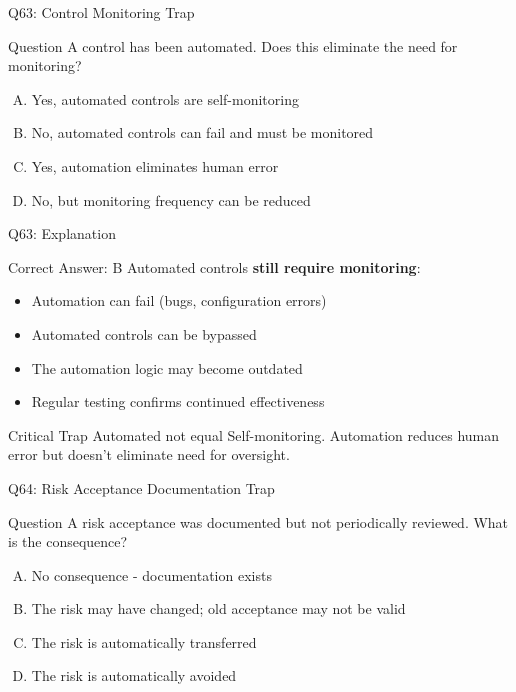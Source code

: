 \documentclass{beamer}
\begin{document}
	\begin{frame}{Q63: Control Monitoring Trap}
		\begin{block}{Question}
			A control has been automated. Does this eliminate the need for monitoring?
		\end{block}
		\begin{enumerate}[(A)]
			\item Yes, automated controls are self-monitoring
			\item No, automated controls can fail and must be monitored
			\item Yes, automation eliminates human error
			\item No, but monitoring frequency can be reduced
		\end{enumerate}
	\end{frame}
	
	\begin{frame}{Q63: Explanation}
		\begin{block}{Correct Answer: B}
			Automated controls \textbf{still require monitoring}:
			\begin{itemize}
				\item Automation can fail (bugs, configuration errors)
				\item Automated controls can be bypassed
				\item The automation logic may become outdated
				\item Regular testing confirms continued effectiveness
			\end{itemize}
		\end{block}
		\begin{alertblock}{Critical Trap}
			Automated not equal Self-monitoring.
			Automation reduces human error but doesn't eliminate need for oversight.
		\end{alertblock}
	\end{frame}
	
	\begin{frame}{Q64: Risk Acceptance Documentation Trap}
		\begin{block}{Question}
			A risk acceptance was documented but not periodically reviewed. What is the consequence?
		\end{block}
		\begin{enumerate}[(A)]
			\item No consequence - documentation exists
			\item The risk may have changed; old acceptance may not be valid
			\item The risk is automatically transferred
			\item The risk is automatically avoided
		\end{enumerate}
	\end{frame}
	
\end{document}
